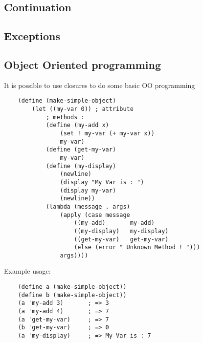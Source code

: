     
\subsection{Continuation}


\subsection{Exceptions}

\subsection{Object Oriented programming}
It is possible to use closures to do some basic OO programming
\begin{lstlisting}
    (define (make-simple-object)
        (let ((my-var 0)) ; attribute
            ; methods :
            (define (my-add x)
                (set ! my-var (+ my-var x))
                my-var)
            (define (get-my-var)
                my-var)
            (define (my-display)
                (newline)
                (display "My Var is : ")
                (display my-var)
                (newline))
            (lambda (message . args)
                (apply (case message
                    ((my-add)       my-add)
                    ((my-display)   my-display)
                    ((get-my-var)   get-my-var)
                    (else (error " Unknown Method ! ")))
                args))))
\end{lstlisting}
Example usage:
\begin{lstlisting}
    (define a (make-simple-object))
    (define b (make-simple-object))
    (a 'my-add 3)       ; => 3
    (a 'my-add 4)       ; => 7
    (a 'get-my-var)     ; => 7
    (b 'get-my-var)     ; => 0
    (a 'my-display)     ; => My Var is : 7
\end{lstlisting}

